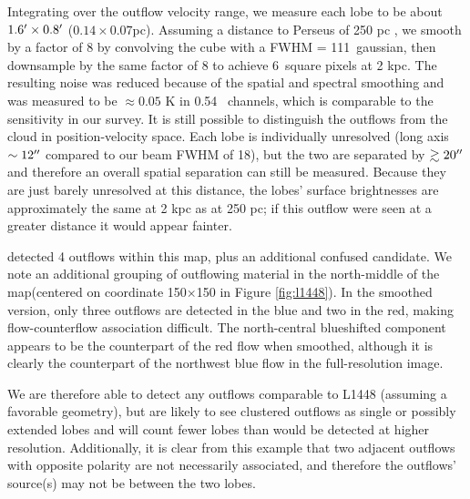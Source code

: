 Integrating over the outflow velocity range, we measure each lobe to be
about $1.6\mbox{$^\prime$}\times0.8\mbox{$^\prime$}$ ($0.14\times0.07$pc).  Assuming a distance
to Perseus of 250 pc \citep[e.g.][]{Enoch2006},  we smooth by a factor of 8 by convolving
the cube with a FWHM = 111\arcsec\ gaussian, then downsample by the same factor of 8
to achieve 6\arcsec\ square pixels at 2 kpc.  The resulting noise was reduced
because of the spatial and spectral smoothing and was measured to be $\approx 0.05$ K in
0.54 \kms\ channels, which is comparable to the sensitivity in our
survey.  It is still possible to distinguish the outflows
from the cloud in position-velocity space.  Each lobe is individually
unresolved (long axis $\sim12\mbox{$^{\prime\prime}$}$ compared to our beam FWHM of 18\arcsec),
but the two are separated by $\gtrsim 20\mbox{$^{\prime\prime}$}$ and therefore an overall
spatial separation can still be measured.  Because they are just barely
unresolved at this distance, the lobes' surface brightnesses are approximately
the same at 2 kpc as at 250 pc; if this outflow were seen at a greater distance
it would appear fainter.

\citet{hatchell2007} detected 4 outflows within this map, plus an additional
confused candidate.  We note an additional grouping of outflowing material in
the north-middle of the map(centered on coordinate 150$\times$150 in Figure
\ref{fig:l1448}).  In the smoothed version, only three outflows are detected in
the blue and two in the red, making flow-counterflow association difficult.
The north-central blueshifted component appears to be the counterpart of the
red flow when smoothed, although it is clearly the counterpart of the northwest
blue flow in the full-resolution image.

We are therefore able to detect any outflows comparable to L1448 (assuming a
favorable geometry), but are likely to see clustered outflows as single or
possibly extended lobes and will count fewer lobes than would be detected at
higher resolution.  Additionally, it is clear from this example that two
adjacent outflows with opposite polarity are not necessarily associated, and
therefore the outflows' source(s) may not be between the two lobes.  


